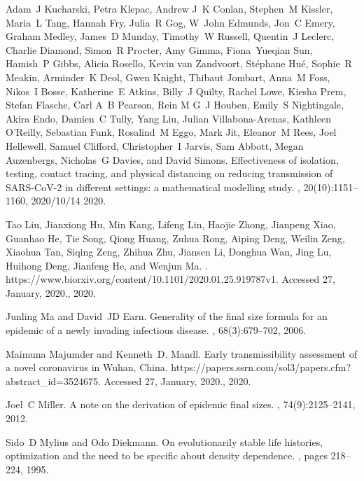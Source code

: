 \documentclass[12pt]{article}
\begin{document}
\begin{thebibliography}{10}
Adam~J Kucharski, Petra Klepac, Andrew J~K Conlan, Stephen~M Kissler, Maria~L
  Tang, Hannah Fry, Julia~R Gog, W~John Edmunds, Jon~C Emery, Graham Medley,
  James~D Munday, Timothy~W Russell, Quentin~J Leclerc, Charlie Diamond,
  Simon~R Procter, Amy Gimma, Fiona~Yueqian Sun, Hamish~P Gibbs, Alicia
  Rosello, Kevin van Zandvoort, St{\'e}phane Hu{\'e}, Sophie~R Meakin,
  Arminder~K Deol, Gwen Knight, Thibaut Jombart, Anna~M Foss, Nikos~I Bosse,
  Katherine~E Atkins, Billy~J Quilty, Rachel Lowe, Kiesha Prem, Stefan Flasche,
  Carl A~B Pearson, Rein M G~J Houben, Emily~S Nightingale, Akira Endo,
  Damien~C Tully, Yang Liu, Julian Villabona-Arenas, Kathleen O'Reilly,
  Sebastian Funk, Rosalind~M Eggo, Mark Jit, Eleanor~M Rees, Joel Hellewell,
  Samuel Clifford, Christopher~I Jarvis, Sam Abbott, Megan Auzenbergs,
  Nicholas~G Davies, and David Simons.
\newblock Effectiveness of isolation, testing, contact tracing, and physical
  distancing on reducing transmission of {SARS-CoV-2} in different settings: a
  mathematical modelling study.
, 20(10):1151--1160, 2020/10/14
  2020.

Tao Liu, Jianxiong Hu, Min Kang, Lifeng Lin, Haojie Zhong, Jianpeng Xiao,
  Guanhao He, Tie Song, Qiong Huang, Zuhua Rong, Aiping Deng, Weilin Zeng,
  Xiaohua Tan, Siqing Zeng, Zhihua Zhu, Jiansen Li, Donghua Wan, Jing Lu,
  Huihong Deng, Jianfeng He, and Wenjun Ma.
.
\newblock https://www.biorxiv.org/content/10.1101/2020.01.25.919787v1. Accessed
  27, January, 2020., 2020.

Junling Ma and David~JD Earn.
\newblock Generality of the final size formula for an epidemic of a newly
  invading infectious disease.
, 68(3):679--702, 2006.

Maimuna Majumder and Kenneth~D. Mandl.
\newblock Early transmissibility assessment of a novel coronavirus in {Wuhan,
  China}.
\newblock https://papers.ssrn.com/sol3/papers.cfm?abstract\_id=3524675.
  Accessed 27, January, 2020., 2020.

Joel~C Miller.
\newblock A note on the derivation of epidemic final sizes.
, 74(9):2125--2141, 2012.

Sido~D Mylius and Odo Diekmann.
\newblock On evolutionarily stable life histories, optimization and the need to
  be specific about density dependence.
, pages 218--224, 1995.


\end{thebibliography}
\end{document}
